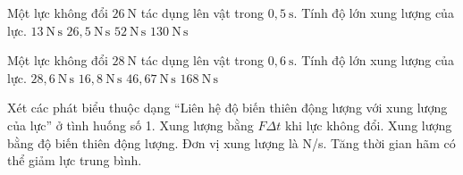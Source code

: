 \begin{ex}
Một lực không đổi $26\ \mathrm{N}$ tác dụng lên vật trong $0,5\ \mathrm{s}$. Tính độ lớn xung lượng của lực.
\choice
{\True $13\ \mathrm{N\,s}$}
{$26,5\ \mathrm{N\,s}$}
{$52\ \mathrm{N\,s}$}
{$130\ \mathrm{N\,s}$}
\end{ex}

\begin{ex}
Một lực không đổi $28\ \mathrm{N}$ tác dụng lên vật trong $0,6\ \mathrm{s}$. Tính độ lớn xung lượng của lực.
\choice
{$28,6\ \mathrm{N\,s}$}
{\True $16,8\ \mathrm{N\,s}$}
{$46,67\ \mathrm{N\,s}$}
{$168\ \mathrm{N\,s}$}
\end{ex}

\begin{ex}
Xét các phát biểu thuộc dạng “Liên hệ độ biến thiên động lượng với xung lượng của lực” ở tình huống số 1.
\choiceTF
{\True Xung lượng bằng $F\Delta t$ khi lực không đổi.}
{\True Xung lượng bằng độ biến thiên động lượng.}
{Đơn vị xung lượng là N/s.}
{\True Tăng thời gian hãm có thể giảm lực trung bình.}
\end{ex}

